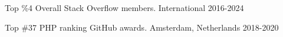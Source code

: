 



\begin{cvhonors}

  \cvhonor
    {Top \%4} %
    {Overall Stack Overflow members.} %
    {International} %
    {2016-2024} %

  \cvhonor
    {Top \#37} %
    {PHP ranking GitHub awards.} %
    {Amsterdam, Netherlands} %
    {2018-2020} %

\end{cvhonors}
